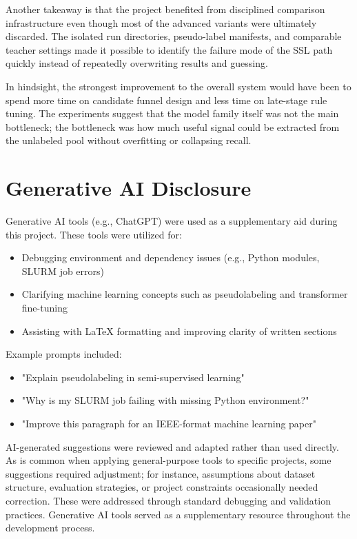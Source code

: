 \documentclass[journal]{IEEEtran}
\begin{document}
Another takeaway is that the project benefited from disciplined comparison infrastructure even though most of the advanced variants were ultimately discarded. The isolated run directories, pseudo-label manifests, and comparable teacher settings made it possible to identify the failure mode of the SSL path quickly instead of repeatedly overwriting results and guessing.

In hindsight, the strongest improvement to the overall system would have been to spend more time on candidate funnel design and less time on late-stage rule tuning. The experiments suggest that the model family itself was not the main bottleneck; the bottleneck was how much useful signal could be extracted from the unlabeled pool without overfitting or collapsing recall.

\section{Generative AI Disclosure}

Generative AI tools (e.g., ChatGPT) were used as a supplementary aid during this project. These tools were utilized for:

\begin{itemize}
    \item Debugging environment and dependency issues (e.g., Python modules, SLURM job errors)
    \item Clarifying machine learning concepts such as pseudolabeling and transformer fine-tuning
    \item Assisting with LaTeX formatting and improving clarity of written sections
\end{itemize}

Example prompts included:
\begin{itemize}
    \item "Explain pseudolabeling in semi-supervised learning"
    \item "Why is my SLURM job failing with missing Python environment?"
    \item "Improve this paragraph for an IEEE-format machine learning paper"
\end{itemize}


AI-generated suggestions were reviewed and adapted rather than used directly. As is common when applying general-purpose tools to specific projects, some suggestions required adjustment; for instance, assumptions about dataset structure, evaluation strategies, or project constraints occasionally needed correction. These were addressed through standard debugging and validation practices.
Generative AI tools served as a supplementary resource throughout the development process.
\end{document}
